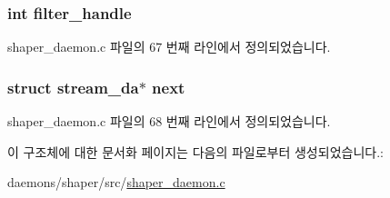 \subsubsection[{\texorpdfstring{filter\+\_\+handle}{filter_handle}}]{\setlength{\rightskip}{0pt plus 5cm}int filter\+\_\+handle}\hypertarget{structstream__da_acfe0fcb6ee8972f5b5bc4b1aca1e8c7a}{}\label{structstream__da_acfe0fcb6ee8972f5b5bc4b1aca1e8c7a}


shaper\+\_\+daemon.\+c 파일의 67 번째 라인에서 정의되었습니다.

\subsubsection[{\texorpdfstring{next}{next}}]{\setlength{\rightskip}{0pt plus 5cm}struct {\bf stream\+\_\+da}$\ast$ next}\hypertarget{structstream__da_a47d59761a90bc27f0a5135bfdf7c6eab}{}\label{structstream__da_a47d59761a90bc27f0a5135bfdf7c6eab}


shaper\+\_\+daemon.\+c 파일의 68 번째 라인에서 정의되었습니다.



이 구조체에 대한 문서화 페이지는 다음의 파일로부터 생성되었습니다.\+:\begin{DoxyCompactItemize}
\item 
daemons/shaper/src/\hyperlink{shaper__daemon_8c}{shaper\+\_\+daemon.\+c}\end{DoxyCompactItemize}

